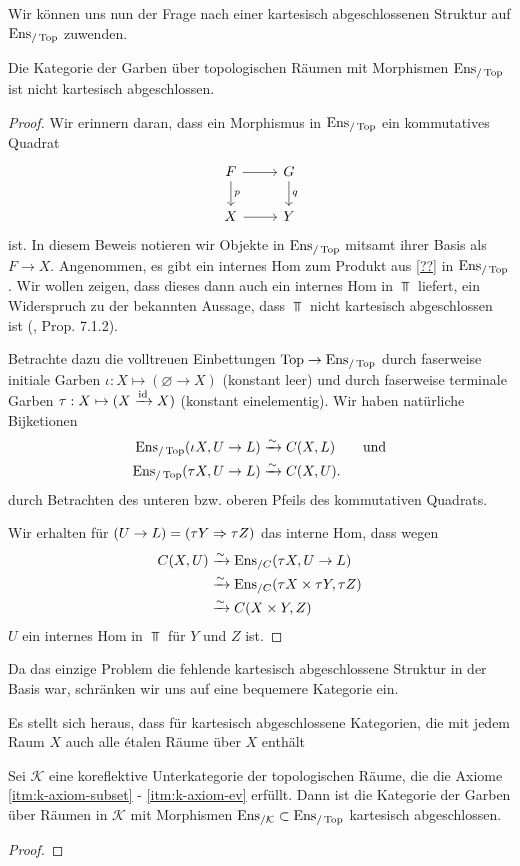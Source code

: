 Wir können uns nun der Frage nach einer kartesisch abgeschlossenen
Struktur auf $\operatorname{Ens}_{/\operatorname{Top}}$ zuwenden.
\begin{prop}
  Die Kategorie der Garben über topologischen Räumen mit Morphismen
  $\operatorname{Ens}_{/\operatorname{Top}}$ ist nicht kartesisch abgeschlossen.
\end{prop}
\begin{proof}
  Wir erinnern daran, dass ein Morphismus in $\operatorname{Ens}_{/\operatorname{Top}}$ ein
  kommutatives Quadrat
  \[ \begin{tikzcd}
    F \arrow[r] \dar{p} & G \dar{q} \\
    X \arrow[r] & Y
  \end{tikzcd} \]
  ist. In diesem Beweis notieren wir Objekte in $\operatorname{Ens}_{/\operatorname{Top}}$ mitsamt
  ihrer Basis als $F \to X$. Angenommen, es gibt ein internes Hom zum
  Produkt aus \ref{??} in $\operatorname{Ens}_{/\operatorname{Top}}$. Wir wollen zeigen, dass dieses
  dann auch ein internes Hom in $\Top$ liefert, ein Widerspruch zu der
  bekannten Aussage, dass $\Top$ nicht kartesisch abgeschlossen ist
  (\cite{Borceux}, Prop. 7.1.2).

  Betrachte dazu die volltreuen Einbettungen $\operatorname{Top} \to \operatorname{Ens}_{/\operatorname{Top}}$ durch
  faserweise initiale Garben $\iota: X \mapsto (\varnothing \to X)$
  (konstant leer) und durch faserweise terminale Garben $\tau: X
  \mapsto (X \xrightarrow{\operatorname{id}} X)$ (konstant einelementig). Wir haben
  natürliche Bijketionen
  \begin{align*}
    \operatorname{Ens}_{/\operatorname{Top}}(\iota X, U \to L) &\xrightarrow[]{\sim} C(X, L) \qquad \text{und} \\
    \operatorname{Ens}_{/\operatorname{Top}}(\tau X, U \to L) &\xrightarrow[]{\sim} C(X, U).
  \end{align*}
  durch Betrachten des unteren bzw. oberen Pfeils des kommutativen
  Quadrats.
  
  Wir erhalten für $(U \to L) = (\tau Y \Rightarrow \tau Z)$ das interne
  Hom, dass wegen
  \begin{align*}
    C(X, U)
    &\xrightarrow[]{\sim} \operatorname{Ens}_{/C}(\tau X, U \to L) \\
    &\xrightarrow[]{\sim} \operatorname{Ens}_{/C}(\tau X \times \tau Y, \tau Z) \\
    &\xrightarrow[]{\sim} C(X \times Y, Z)
  \end{align*}
  $U$ ein internes Hom in $\Top$ für $Y$ und $Z$ ist.

\end{proof}
Da das einzige Problem die fehlende kartesisch abgeschlossene Struktur
in der Basis war, schränken wir uns auf eine bequemere Kategorie
ein.

Es stellt sich heraus, dass für kartesisch abgeschlossene
Kategorien, die mit jedem Raum $X$ auch alle étalen Räume über $X$
enthält
\begin{satz}
  Sei $\mathcal{K}$ eine koreflektive Unterkategorie der topologischen
  Räume, die die Axiome \ref{itm:k-axiom-subset} -
  \ref{itm:k-axiom-ev} erfüllt. Dann ist die Kategorie der Garben über
  Räumen in $\mathcal{K}$ mit Morphismen $\operatorname{Ens}_{/\mathcal{K}} \subset
  \operatorname{Ens}_{/\operatorname{Top}}$ kartesisch abgeschlossen.
\end{satz}
\begin{proof}
\end{proof}



